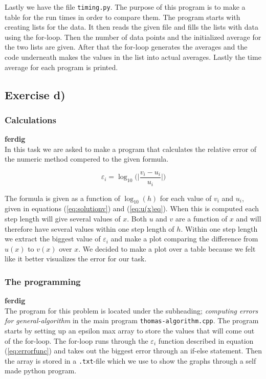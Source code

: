 \documentclass{article}
\begin{document}
    Lastly we have the file \texttt{timing.py}. The purpose of this program is to make a table for the run times in order to compare them. The program starts with creating lists for the data. It then reads the given file and fills the lists with data using the for-loop. Then the number of data points and the initialized average for the two lists are given. After that the for-loop generates the averages and the code underneath makes the values in the list into actual averages. Lastly the time average for each program is printed.


\subsection{Exercise d)} \label{sec:Method d)}

  \subsubsection{Calculations}

    {\bf ferdig} \\

    In this task we are asked to make a program that calculates the relative error of the numeric method compered to the given formula.

    \begin{equation}
      \varepsilon_i = \log_{10} \bigg( \bigg| \frac{v_i - u_i}{u_i} \bigg| \bigg)    \label{eq:errorfunc}
    \end{equation}

    The formula is given as a function of $\log_{10}(h)$ for each value of $v_i$ and $u_i$, given in equations (\ref{eq:solutionv}) and (\ref{eq:u(x)eq}). When this is computed each step length will give several values of $x$. Both $u$ and $v$ are a function of $x$ and will therefore have several values within one step length of $h$. Within one step length we extract the biggest value of $\varepsilon_i$ and make a plot comparing the difference from $u(x)$ to $v(x)$ over $x$. We decided to make a plot over a table because we felt like it better visualizes the error for our task.


  \subsubsection{The programming}

    {\bf ferdig} \\

    The program for this problem is located under the subheading; \textit{computing errors for general-algorithm} in the main program \texttt{thomas-algorithm.cpp}. The program starts by setting up an epsilon max array to store the values that will come out of the for-loop. The for-loop runs through the $\varepsilon_i$ function described in equation (\ref{eq:errorfunc}) and takes out the biggest error through an if-else statement. Then the array is stored in a \texttt{.txt}-file which we use to show the graphs through a self made python program. \\
\end{document}
